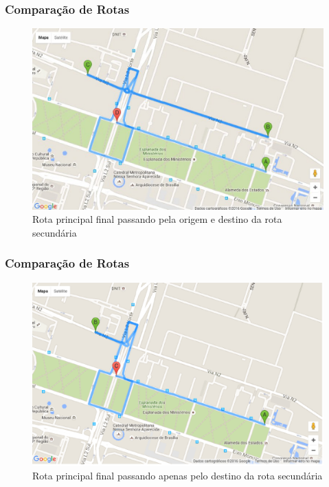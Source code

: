 \documentclass{beamer}
\begin{document}
\begin{frame}
\frametitle{Comparação de Rotas}

\begin{figure}[h]
	\centering
	\includegraphics[scale=0.35]{figuras/juncao_rotas.eps}
	\caption{Rota principal final passando pela origem e destino da rota secundária}
\end{figure}

\end{frame}

\begin{frame}
\frametitle{Comparação de Rotas}

\begin{figure}[h]
	\centering
	\includegraphics[scale=0.35]{figuras/desvio_destino.eps}
	\caption{Rota principal final passando apenas pelo destino da rota secundária}
\end{figure}

\end{frame}
\end{document}
